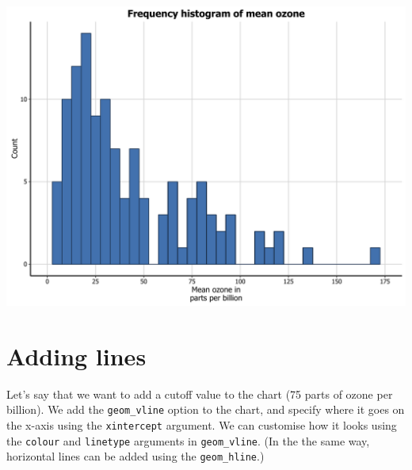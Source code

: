 \begin{center}\includegraphics[width=0.55\linewidth]{figures/histogram_16-1} \end{center}

\section{Adding lines}\label{adding-lines}

Let's say that we want to add a cutoff value to the chart (75 parts of
ozone per billion). We add the \texttt{geom\_vline} option to the chart,
and specify where it goes on the x-axis using the \texttt{xintercept}
argument. We can customise how it looks using the \texttt{colour} and
\texttt{linetype} arguments in \texttt{geom\_vline}. (In the the same
way, horizontal lines can be added using the \texttt{geom\_hline}.)

